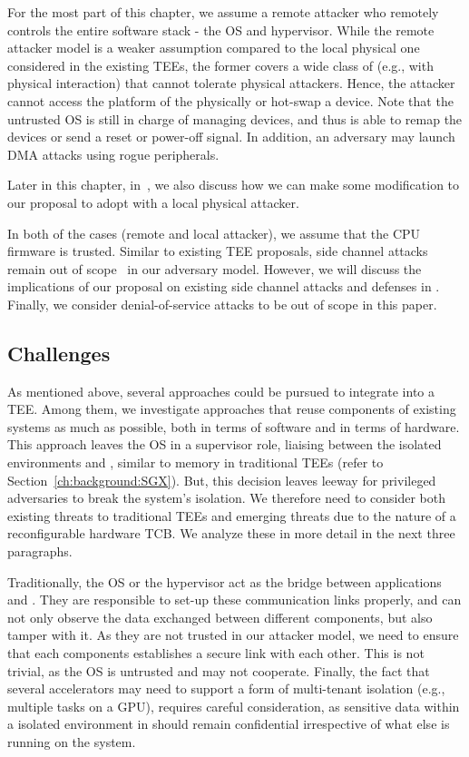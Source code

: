 For the most part of this chapter, we assume a remote attacker who remotely controls the entire software stack - the OS and hypervisor. While the remote attacker model is a weaker assumption compared to the local physical one considered in the existing TEEs, the former covers a wide class of \sphw (e.g., \sphw with physical interaction) that cannot tolerate physical attackers. Hence, the attacker cannot access the platform of the \sphw physically or hot-swap a device. Note that the untrusted OS is still in charge of managing \sphw devices, and thus is able to remap the devices or send a reset or power-off signal. In addition, an adversary may launch DMA attacks using rogue peripherals.

Later in this chapter, in~, we also discuss how we can make some modification to our proposal to adopt with a local physical attacker. 

In both of the cases (remote and local attacker), we assume that the CPU firmware is trusted. Similar to existing TEE proposals, side channel attacks remain out of scope~\cite{costan2016intel} in our adversary model. However, we will discuss the implications of our proposal on existing side channel attacks and defenses in . Finally, we consider denial-of-service attacks to be out of scope in this paper. 



\subsection{Challenges}
\label{pue:sec:problemStatement:challenges}

As mentioned above, several approaches could be pursued to integrate \sphw into a TEE. Among them, we investigate approaches that reuse components of existing systems as much as possible, both in terms of software and in terms of hardware.  
This approach leaves the OS in a supervisor role, liaising between the isolated environments and \sphw, similar to memory in traditional TEEs (refer to  Section~\ref{ch:background:SGX}). But, this decision leaves leeway for privileged adversaries to break the system's isolation. We therefore need to consider both existing threats to traditional TEEs and emerging threats due to the nature of a reconfigurable hardware TCB. 
We analyze these in more detail in the next three paragraphs.


Traditionally, the OS or the hypervisor act as the bridge between applications and \sphw. They are responsible to set-up these communication links properly, and can not only observe the data exchanged between different components, but also tamper with it. As they are not trusted in our attacker model, we need to ensure that each components establishes a secure link with each other. This is not trivial, as the OS is untrusted and may not cooperate. 
Finally, the fact that several accelerators may need to support a form of multi-tenant isolation (e.g., multiple tasks on a GPU), requires careful consideration, as sensitive data within a isolated environment in \name should remain confidential irrespective of what else is running on the system.



